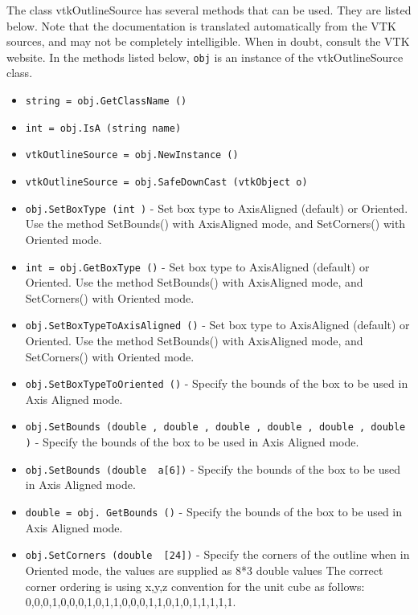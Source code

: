 The class vtkOutlineSource has several methods that can be used.
  They are listed below.
Note that the documentation is translated automatically from the VTK sources,
and may not be completely intelligible.  When in doubt, consult the VTK website.
In the methods listed below, \verb|obj| is an instance of the vtkOutlineSource class.
\begin{itemize}
\item  \verb|string = obj.GetClassName ()|

\item  \verb|int = obj.IsA (string name)|

\item  \verb|vtkOutlineSource = obj.NewInstance ()|

\item  \verb|vtkOutlineSource = obj.SafeDownCast (vtkObject o)|

\item  \verb|obj.SetBoxType (int )| -  Set box type to AxisAligned (default) or Oriented.
 Use the method SetBounds() with AxisAligned mode, and SetCorners() 
 with Oriented mode.

\item  \verb|int = obj.GetBoxType ()| -  Set box type to AxisAligned (default) or Oriented.
 Use the method SetBounds() with AxisAligned mode, and SetCorners() 
 with Oriented mode.

\item  \verb|obj.SetBoxTypeToAxisAligned ()| -  Set box type to AxisAligned (default) or Oriented.
 Use the method SetBounds() with AxisAligned mode, and SetCorners() 
 with Oriented mode.

\item  \verb|obj.SetBoxTypeToOriented ()| -  Specify the bounds of the box to be used in Axis Aligned mode.

\item  \verb|obj.SetBounds (double , double , double , double , double , double )| -  Specify the bounds of the box to be used in Axis Aligned mode.

\item  \verb|obj.SetBounds (double  a[6])| -  Specify the bounds of the box to be used in Axis Aligned mode.

\item  \verb|double = obj. GetBounds ()| -  Specify the bounds of the box to be used in Axis Aligned mode.

\item  \verb|obj.SetCorners (double  [24])| -  Specify the corners of the outline when in Oriented mode, the
 values are supplied as 8*3 double values The correct corner
 ordering is using {x,y,z} convention for the unit cube as follows:
 {0,0,0},{1,0,0},{0,1,0},{1,1,0},{0,0,1},{1,0,1},{0,1,1},{1,1,1}.


\end{itemize}
